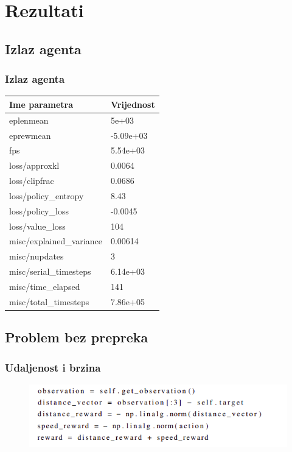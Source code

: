 \documentclass{beamer}
\begin{document}
\section{Rezultati}
\subsection{Izlaz agenta}

\begin{frame}
	\frametitle{Izlaz agenta}

	\begin{table}[ht!]
		\centering
		\label{tab:izlaz_agenta}
		\begin{tabular}{@{}ll@{}}
			\hline
			Ime parametra            & Vrijednost \\
			\hline
			\hline
			eplenmean                & 5e+03      \\
			eprewmean                & -5.09e+03  \\
			fps                      & 5.54e+03   \\
			loss/approxkl            & 0.0064     \\
			loss/clipfrac            & 0.0686     \\
			loss/policy\_entropy     & 8.43       \\
			loss/policy\_loss        & -0.0045    \\
			loss/value\_loss         & 104        \\
			misc/explained\_variance & 0.00614    \\
			misc/nupdates            & 3          \\
			misc/serial\_timesteps   & 6.14e+03   \\
			misc/time\_elapsed       & 141        \\
			misc/total\_timesteps    & 7.86e+05   \\
			\hline
		\end{tabular}
	\end{table}

\end{frame}

\subsection{Problem bez prepreka}

\begin{frame}[fragile]
	\frametitle{Udaljenost i brzina}

	\begin{figure}[h!]
		\centering
		\includegraphics[width=\columnwidth]{img/ub.png}
	\end{figure}

\end{frame}
\end{document}
